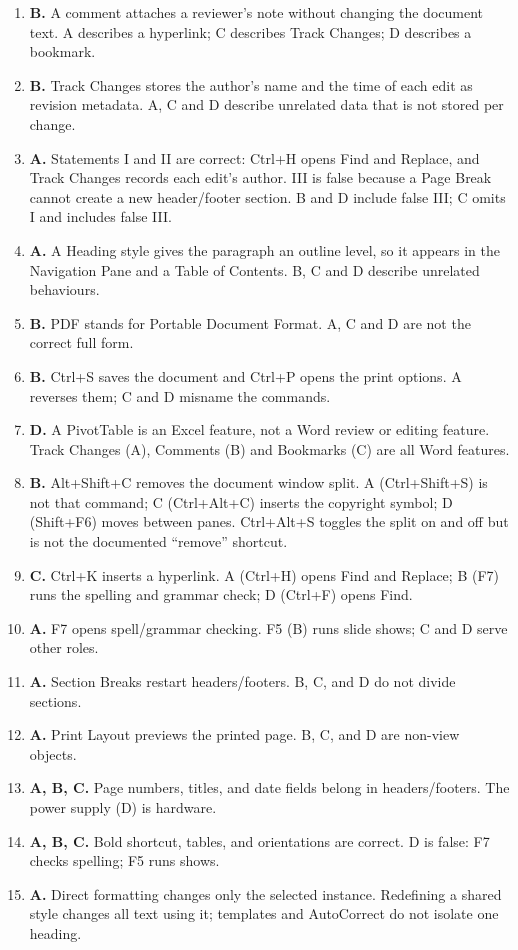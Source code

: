 \begin{enumerate}[label=\textbf{Q\arabic*.}, leftmargin=*]
  metadata).
\item \textbf{B.} A comment attaches a reviewer's note without changing the
  document text. A describes a hyperlink; C describes Track Changes; D
  describes a bookmark.
\item \textbf{B.} Track Changes stores the author's name and the time of each
  edit as revision metadata. A, C and D describe unrelated data that is not
  stored per change.
\item \textbf{A.} Statements I and II are correct: Ctrl+H opens Find and
  Replace, and Track Changes records each edit's author. III is false because a
  Page Break cannot create a new header/footer section. B and D include false
  III; C omits I and includes false III.
\item \textbf{A.} A Heading style gives the paragraph an outline level, so it
  appears in the Navigation Pane and a Table of Contents. B, C and D describe
  unrelated behaviours.
\item \textbf{B.} PDF stands for Portable Document Format. A, C and D are not
  the correct full form.
\item \textbf{B.} Ctrl+S saves the document and Ctrl+P opens the print
  options. A reverses them; C and D misname the commands.
\item \textbf{D.} A PivotTable is an Excel feature, not a Word review or
  editing feature. Track Changes (A), Comments (B) and Bookmarks (C) are all
  Word features.
\item \textbf{B.} Alt+Shift+C removes the document window split. A
  (Ctrl+Shift+S) is not that command; C (Ctrl+Alt+C) inserts the copyright
  symbol; D (Shift+F6) moves between panes. Ctrl+Alt+S toggles the split on and
  off but is not the documented ``remove'' shortcut.
\item \textbf{C.} Ctrl+K inserts a hyperlink. A (Ctrl+H) opens Find and
  Replace; B (F7) runs the spelling and grammar check; D (Ctrl+F) opens Find.

\item \textbf{A.} F7 opens spell/grammar checking. F5 (B) runs slide shows; C and D serve other roles.
\item \textbf{A.} Section Breaks restart headers/footers. B, C, and D do not divide sections.
\item \textbf{A.} Print Layout previews the printed page. B, C, and D are non-view objects.
\item \textbf{A, B, C.} Page numbers, titles, and date fields belong in headers/footers. The power supply (D) is hardware.
\item \textbf{A, B, C.} Bold shortcut, tables, and orientations are correct. D is false: F7 checks spelling; F5 runs shows.
\item \textbf{A.} Direct formatting changes only the selected instance. Redefining a shared style changes all text using it; templates and AutoCorrect do not isolate one heading.


\end{enumerate}
